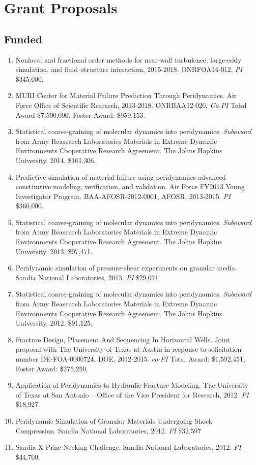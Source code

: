 \section*{Grant Proposals}

\subsection*{Funded}

\begin{enumerate}
  \item Nonlocal and fractional order methods for near-wall turbulence, large-eddy simulation, and fluid--structure interaction, 2015-2018. ONRFOA14-012, \textit{PI} {\$}345,000.
  \item MURI Center for Material Failure Prediction Through Peridynamics. Air Force Office of Scientific Research, 2013-2018. ONRBAA12-020, \textit{Co-PI} Total Award {\$}7,500,000.  Foster Award: \$959,153.
  \item Statistical coarse-graining of molecular dynamics into peridynamics. \textit{Subaward} from Army Reasearch Laboratories Materials in Extreme Dynamic Environments Cooperative Research Agreement.  The Johns Hopkins University, 2014.  \$101,306.
  \item Predictive simulation of material failure using peridynamics-advanced constitutive modeling, verification, and validation. Air Force FY2013 Young Investigator Program. BAA-AFOSR-2012-0001, AFOSR, 2013-2015. \textit{PI} \$360,000.
  \item Statistical coarse-graining of molecular dynamics into peridynamics. \textit{Subaward} from Army Reasearch Laboratories Materials in Extreme Dynamic Environments Cooperative Research Agreement.  The Johns Hopkins University, 2013.  \$97,471.
  \item Peridynamic simulation of pressure-shear experiments on granular media.  Sandia National Laboratories, 2013. \textit{PI} \$29,071
  \item Statistical coarse-graining of molecular dynamics into peridynamics. \textit{Subaward} from Army Reasearch Laboratories Materials in Extreme Dynamic Environments Cooperative Research Agreement.  The Johns Hopkins University, 2012.  \$91,125.
  \item Fracture Design, Placement And Sequencing In Horizontal Wells. Joint proposal with The University of Texas at Austin in response to solicitation number DE-FOA-0000724.  DOE, 2012-2015. \textit{co-PI} Total Award: {\$1,592,451}, Foster Award: \$275,250.
  \item Application of Peridynamics to Hydraulic Fracture Modeling. The University of Texas at San Antonio -- Office of the Vice President for Research, 2012. \textit{PI} \$18,927.
  \item Peridynamic Simulation of Granular Materials Undergoing Shock Compression.  Sandia National Laboratories, 2012. \textit{PI} \$32,597
  \item Sandia X-Prize Necking Challenge.  Sandia National Laboratories, 2012. \textit{PI} \$44,700.
\end{enumerate}

